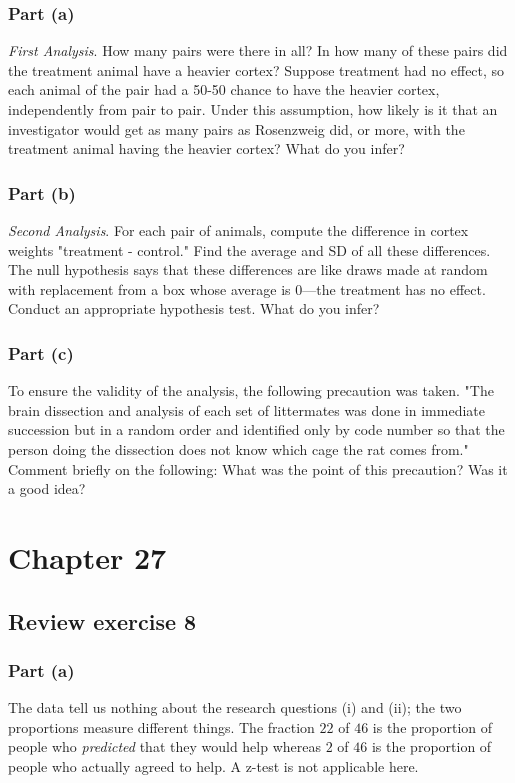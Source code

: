 \documentclass[11pt]{article}
\begin{document}
\subsubsection*{Part (a)}
\textit{First Analysis}.
How many pairs were there in all?
In how many of these pairs did the treatment animal have a heavier cortex?
Suppose treatment had no effect, so each animal of the pair had a 50-50 chance to have the heavier cortex, independently from pair to pair.
Under this assumption, how likely is it that an investigator would get as many pairs as Rosenzweig did, or more, with the treatment animal having the heavier cortex?
What do you infer?

\subsubsection*{Part (b)}
\textit{Second Analysis}.
For each pair of animals, compute the difference in cortex weights "treatment - control."
Find the average and SD of all these differences.
The null hypothesis says that these differences are like draws made at random with replacement from a box whose average is 0---the treatment has no effect.
Conduct an appropriate hypothesis test.
What do you infer?

\subsubsection*{Part (c)}
To ensure the validity of the analysis, the following precaution was taken.
"The brain dissection and analysis of each set of littermates was done in immediate succession but in a random order and identified only by code number so that the person doing the dissection does not know which cage the rat comes from."
Comment briefly on the following: What was the point of this precaution?
Was it a good idea?


\section*{Chapter 27}
\subsection*{Review exercise 8} %
\subsubsection*{Part (a)}
The data tell us nothing about the research questions (i) and (ii); the two proportions measure different things.  The fraction $22$ of $46$ is the proportion of people who \textit{predicted} that they would help whereas $2$ of $46$ is the proportion of people who actually agreed to help.  A z-test is not applicable here.
\end{document}
